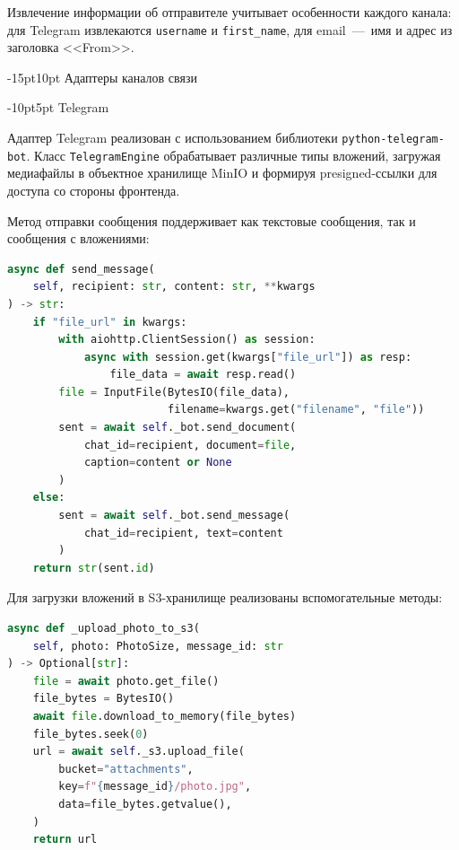 \documentclass[12pt,a4paper]{report}
\makeatletter
\renewcommand{\section}{%
  \@startsection{section}{1}{\z@}%
  {-15pt}{10pt}%
  {\centering\normalfont\bfseries\large}}
\renewcommand{\subsection}{%
  \@startsection{subsection}{2}{\z@}%
  {-10pt}{5pt}%
  {\normalfont\bfseries\large}}
\makeatother
\begin{document}
Извлечение информации об отправителе учитывает особенности каждого канала: для Telegram извлекаются \texttt{username} и \texttt{first\_name}, для email~---~имя и адрес из заголовка <<From>>.

\section{Адаптеры каналов связи}

\subsection{Telegram}

Адаптер Telegram реализован с использованием библиотеки \texttt{python-telegram-bot}. Класс \texttt{TelegramEngine} обрабатывает различные типы вложений, загружая медиафайлы в объектное хранилище MinIO и формируя presigned-ссылки для доступа со стороны фронтенда.

Метод отправки сообщения поддерживает как текстовые сообщения, так и сообщения с вложениями:

\begin{lstlisting}[language=Python]
async def send_message(
    self, recipient: str, content: str, **kwargs
) -> str:
    if "file_url" in kwargs:
        with aiohttp.ClientSession() as session:
            async with session.get(kwargs["file_url"]) as resp:
                file_data = await resp.read()
        file = InputFile(BytesIO(file_data),
                         filename=kwargs.get("filename", "file"))
        sent = await self._bot.send_document(
            chat_id=recipient, document=file,
            caption=content or None
        )
    else:
        sent = await self._bot.send_message(
            chat_id=recipient, text=content
        )
    return str(sent.id)
\end{lstlisting}

Для загрузки вложений в S3-хранилище реализованы вспомогательные методы:

\begin{lstlisting}[language=Python]
async def _upload_photo_to_s3(
    self, photo: PhotoSize, message_id: str
) -> Optional[str]:
    file = await photo.get_file()
    file_bytes = BytesIO()
    await file.download_to_memory(file_bytes)
    file_bytes.seek(0)
    url = await self._s3.upload_file(
        bucket="attachments",
        key=f"{message_id}/photo.jpg",
        data=file_bytes.getvalue(),
    )
    return url
\end{lstlisting}
\end{document}
